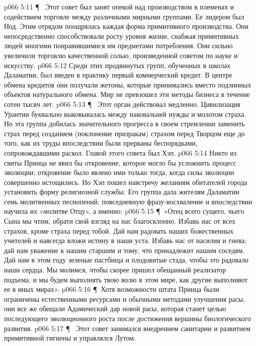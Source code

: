 \vs p066 5:11 \P\ \bibnobreakspace {} Этот совет был занят опекой над производством в племенах и содействием торговле между различными мирными группами. Ее лидером был Нод. Этим отрядом поощрялась каждая форма примитивного производства. Они непосредственно способствовали росту уровня жизни, снабжая примитивных людей многими понравившимися им предметами потребления. Они сильно увеличили торговлю качественной солью, произведенной советом по науке и искусству.
\vs p066 5:12 Среди этих продвинутых групп, обученных в школах Даламатии, был введен в практику первый коммерческий кредит. В центре обмена кредитов они получали жетоны, которые принимались вместо подлинных объектов натурального обмена. Мир не превзошел эти методы бизнеса в течение сотен тысяч лет.
\vs p066 5:13 \P\ \bibnobreakspace {} Этот орган действовал медленно. Цивилизация Урантии буквально выковывалась между наковальней нужды и молотом страха. Но эта группа добилась значительного прогресса в своем стремлении заменить страх перед созданием (поклонение призракам) страхом перед Творцом еще до того, как их труды впоследствии были прерваны беспорядками, сопровождавшими раскол. Главой этого совета был Хэп.
\vs p066 5:14 Никто из свиты Принца не явил бы откровение, которое могло бы усложнить процесс эволюции; откровение было явлено ими только тогда, когда силы эволюции совершенно истощились. Но Хэп пошел навстречу желаниям обитателей города установить форму религиозной службы. Его группа дала жителям Даламатии семь молитвенных песнопений, повседневную фразу\hyp{}восхваление и впоследствии научила их «молитве Отцу», а именно:
\vs p066 5:15 \P\ «Отец всего сущего, чьего Сына мы чтим, обрати свой взгляд на нас благосклонно. Избавь нас от всех страхов, кроме страха перед тобой. Дай нам радовать наших божественных учителей и навсегда вложи истину в наши уста. Избавь нас от насилия и гнева; дай нам уважение к нашим старшим и тому, что принадлежит нашим соседям. Дай нам в этом году зеленые пастбища и плодовитые стада, чтобы это радовало наши сердца. Мы молимся, чтобы скорее пришел обещанный реализатор подъема, и мы будем выполнять твою волю в этом мире, как другие выполняют ее в иных мирах».
\vs p066 5:16 \P\ Хотя возможности штата Принца были ограничены естественными ресурсами и обычными методами улучшения расы, они все же обещали Адамический дар новой расы, которая станет целью последующего эволюционного роста после достижения вершины биологического развития.
\vs p066 5:17 \P\ \bibnobreakspace {} Этот совет занимался внедрением санитарии и развитием примитивной гигиены и управлялся Лутом.
